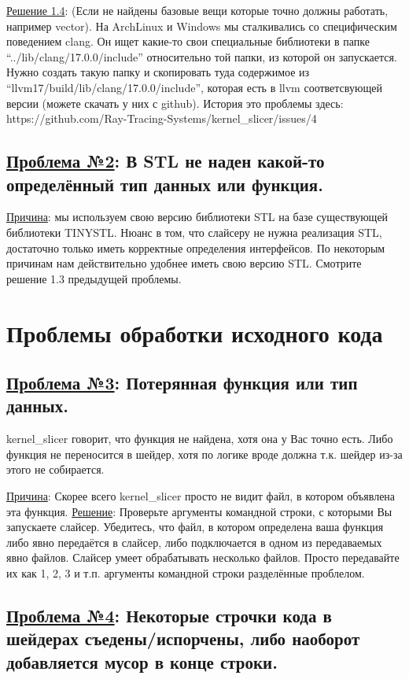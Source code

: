 \documentclass[11pt,fleqn,english,russian]{report} %
\begin{document}
\vspace*{5px}
\noindent\underline{Решение 1.4}: (Если не найдены базовые вещи которые точно должны работать, например vector). На ArchLinux и Windows мы сталкивались со специфическим поведением clang. Он ищет какие-то свои специальные библиотеки в папке ``../lib/clang/17.0.0/include'' относительно той папки, из которой он запускается. Нужно создать такую папку и скопировать туда содержимое из ``llvm17/build/lib/clang/17.0.0/include'', которая есть в llvm соответсвующей версии (можете скачать у них с github). История это проблемы здесь: https://github.com/Ray-Tracing-Systems/kernel\_slicer/issues/4

\subsection{\underline{Проблема №2}: В STL не наден какой-то определённый тип данных или функция.}

\noindent\underline{Причина}: мы используем свою версию библиотеки STL на базе существующей библиотеки TINYSTL. Нюанс в том, что слайсеру не нужна реализация STL, достаточно только иметь корректные определения интерфейсов. По некоторым причинам нам действительно удобнее иметь свою версию STL. Смотрите решение 1.3 предыдущей проблемы.

\section{Проблемы обработки исходного кода}

\subsection{\underline{Проблема №3}: Потерянная функция или тип данных.} kernel\_slicer говорит, что функция не найдена, хотя она у Вас точно есть. Либо функция не переносится в шейдер, хотя по логике вроде должна т.к. шейдер из-за этого не собирается.

\noindent\underline{Причина}: Скорее всего kernel\_slicer просто не видит файл, в котором объявлена эта функция. \underline{Решение}: Проверьте аргументы командной строки, с которыми Вы запускаете слайсер. Убедитесь, что файл, в котором определена ваша функция либо явно передаётся в слайсер, либо подключается в одном из передаваемых явно файлов. Слайсер умеет обрабатывать несколько файлов. Просто передавайте их как 1, 2, 3 и т.п. аргументы командной строки разделённые проблелом.  

\subsection{\underline{Проблема №4}: Некоторые строчки кода в шейдерах съедены/испорчены, либо наоборот добавляется мусор в конце строки.}
\end{document}

